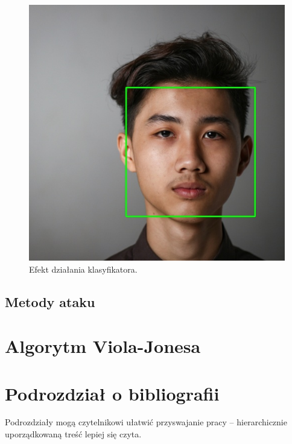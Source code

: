 \documentclass[12pt,a4paper,leqno,oneside,titlepage]{book}
\begin{document}
\begin{figure}[!tbp]
\begin{minipage}[b]{0.4\textwidth}
    \includegraphics[width=\textwidth]{pictures/face_detected.jpg}
    \caption{Efekt działania klasyfikatora.}
  \end{minipage}
\end{figure}

\subsection{Metody ataku}

\section{Algorytm Viola-Jonesa}

\section{Podrozdział o bibliografii}

Podrozdziały mogą czytelnikowi ułatwić przyswajanie pracy -- hierarchicznie uporządkowaną treść lepiej się czyta.
\end{document}
